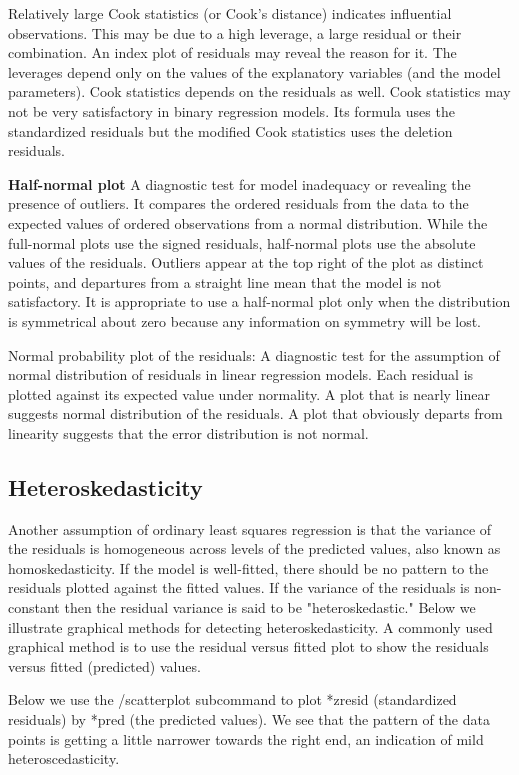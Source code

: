 \documentclass[12pt, a4paper]{report}
\begin{document}
Relatively large Cook statistics (or Cook's distance) indicates influential observations. This may be due to a high leverage, a large residual or their combination. An index plot of residuals may reveal the reason for it. The leverages depend only on the values of the explanatory variables (and the model parameters). Cook statistics depends on the residuals as well. Cook statistics may not be very satisfactory in binary regression models. Its formula uses the standardized residuals but the modified Cook statistics uses the deletion residuals.

\textbf{Half-normal plot} A diagnostic test for model inadequacy or revealing the presence of outliers. It compares the ordered residuals from the data to the expected values of ordered observations from a normal distribution. While the full-normal plots use the signed residuals, half-normal plots use the absolute values of the residuals. Outliers appear at the top right of the plot as distinct points, and departures from a straight line mean that the model is not satisfactory. It is appropriate to use a half-normal plot only when the distribution is symmetrical about zero because any information on symmetry will be lost.

Normal probability plot of the residuals: A diagnostic test for the assumption of normal distribution of residuals in linear regression models. Each residual is plotted against its expected value under normality. A plot that is nearly linear suggests normal distribution of the residuals. A plot that obviously departs from linearity suggests that the error distribution is not normal.

\subsection{Heteroskedasticity}

Another assumption of ordinary least squares regression is that the variance of the residuals is homogeneous across levels of the predicted values, also known as homoskedasticity. If the model is well-fitted, there should be no pattern to the residuals plotted against the fitted values. If the variance of the residuals is non-constant then the residual variance is said to be "heteroskedastic." Below we illustrate graphical methods for detecting heteroskedasticity. A commonly used graphical method is to use the residual versus fitted plot to show the residuals versus fitted (predicted) values.

Below we use the /scatterplot subcommand to plot *zresid (standardized residuals) by *pred (the predicted values).  We see that the pattern of the data points is getting a little narrower towards the right end, an indication of mild heteroscedasticity.
\end{document}
